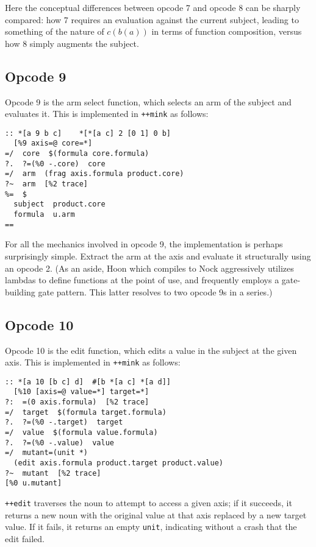 \documentclass[twoside]{article}
\begin{document}
\noindent
Here the conceptual differences between opcode 7 and opcode 8 can be sharply compared:  how 7 requires an evaluation against the current subject, leading to something of the nature of $c(b(a))$ in terms of function composition, versus how 8 simply augments the subject.

\subsection{Opcode 9}

Opcode 9 is the arm select function, which selects an arm of the subject and evaluates it.  This is implemented in \lstinline[style=inlinecode]{++mink} as follows:

\begin{lstlisting}[style=listingcode]
:: *[a 9 b c]    *[*[a c] 2 [0 1] 0 b]
  [%9 axis=@ core=*]
=/  core  $(formula core.formula)
?.  ?=(%0 -.core)  core
=/  arm  (frag axis.formula product.core)
?~  arm  [%2 trace]
%=  $
  subject  product.core
  formula  u.arm
==
\end{lstlisting}

\noindent
For all the mechanics involved in opcode 9, the implementation is perhaps surprisingly simple.  Extract the arm at the axis and evaluate it structurally using an opcode 2.  (As an aside, Hoon which compiles to Nock aggressively utilizes lambdas to define functions at the point of use, and frequently employs a gate-building gate pattern.  This latter resolves to two opcode 9s in a series.)

\subsection{Opcode 10}

Opcode 10 is the edit function, which edits a value in the subject at the given axis.  This is implemented in \lstinline[style=inlinecode]{++mink} as follows:

\begin{lstlisting}[style=listingcode]
:: *[a 10 [b c] d]  #[b *[a c] *[a d]]
  [%10 [axis=@ value=*] target=*]
?:  =(0 axis.formula)  [%2 trace]
=/  target  $(formula target.formula)
?.  ?=(%0 -.target)  target
=/  value  $(formula value.formula)
?.  ?=(%0 -.value)  value
=/  mutant=(unit *)
  (edit axis.formula product.target product.value)
?~  mutant  [%2 trace]
[%0 u.mutant]
\end{lstlisting}

\noindent
\lstinline[style=inlinecode]{++edit} traverses the noun to attempt to access a given axis; if it succeeds, it returns a new noun with the original value at that axis replaced by a new target value.  If it fails, it returns an empty \texttt{unit}, indicating without a crash that the edit failed.
\end{document}
